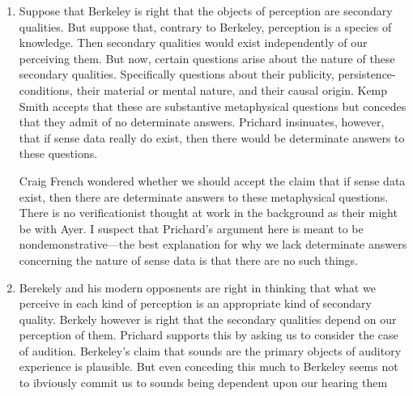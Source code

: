 \documentclass[11pt]{article}
\begin{document}
\begin{enumerate}
    \item Suppose that Berkeley is right that the objects of perception are secondary qualities. But suppose that, contrary to Berkeley, perception is a species of knowledge. Then secondary qualities would exist independently of our perceiving them. But now, certain questions arise about the nature of these secondary qualities. Specifically questions about their publicity, persistence-conditions, their material or mental nature, and their causal origin. Kemp Smith accepts that these are substantive metaphysical questions but concedes that they admit of no determinate answers. Prichard insinuates, however, that if sense data really do exist, then there would be determinate answers to these questions.
    \begin{discussion}
        Craig French wondered whether we should accept the claim that if sense data exist, then there are determinate answers to these metaphysical questions. There is no verificationist thought at work in the background as their might be with Ayer. I suspect that Prichard's argument here is meant to be nondemonstrative---the best explanation for why we lack determinate answers concerning the nature of sense data is that there are no such things.
    \end{discussion}
    \item Berekely and his modern opposnents are right in thinking that what we perceive in each kind of perception is an appropriate kind of secondary quality. Berkely however is right that the secondary qualities depend on our perception of them. Prichard supports this by asking us to consider the case of audition. Berkeley's claim that sounds are the primary objects of auditory experience is plausible. But even conceding this much to Berkeley seems not to ibviously commit us to sounds being dependent upon our hearing them
\end{enumerate}
\end{document}
